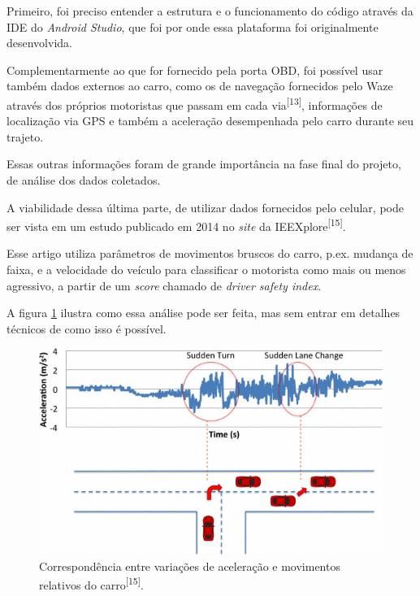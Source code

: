 Primeiro, foi preciso entender a estrutura e o funcionamento do código através da IDE do \textit{Android Studio}, que foi por onde essa plataforma foi originalmente desenvolvida.

Complementarmente ao que for fornecido pela porta OBD, foi possível usar também dados externos ao carro, como os de navegação fornecidos pelo Waze através dos próprios motoristas que passam em cada via\textsuperscript{[13]}, informações de localização via GPS e também a aceleração desempenhada pelo carro durante seu trajeto.

Essas outras informações foram de grande importância na fase final do projeto, de análise dos dados coletados.

A viabilidade dessa última parte, de utilizar dados fornecidos pelo celular, pode ser vista em um estudo publicado em 2014 no \textit{site} da IEEXplore\textsuperscript{[15]}.

Esse artigo utiliza parâmetros de movimentos bruscos do carro, p.ex. mudança de faixa, e a velocidade do veículo para classificar o motorista como mais ou menos agressivo, a partir de um \textit{score} chamado de \textit{driver safety index}.

A figura \ref{fig:sudden_acc_car} ilustra como essa análise pode ser feita, mas sem entrar em detalhes técnicos de como isso é possível.

\begin{figure}[hp]
    \centering
    
    \includegraphics[scale=0.6]{figures/sudden_acc_car.jpg}
    
    \caption{Correspondência entre variações de aceleração e movimentos relativos do carro\textsuperscript{[15]}.}
    
    \label{fig:sudden_acc_car}
\end{figure}

